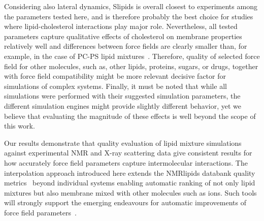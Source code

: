 \documentclass[journal=jctcce]{achemso}
\begin{document}
Considering also lateral dynamics, Slipids is overall closest to experiments among the parameters tested here, and is therefore probably the best choice for studies where lipid-cholesterol interactions play major role. 
Nevertheless, all tested parameters capture qualitative effects of cholesterol on membrane properties relatively well and differences between force fields are clearly smaller than, for example, in the case of PC-PS lipid mixtures~\cite{antila2022emerging}. Therefore, quality of selected force field for other molecules, such as,
other lipids, proteins, sugars, or drugs, 
together with force field compatibility might be more relevant decisive factor for simulations of complex systems. Finally, it must be noted that while all simulations were performed with their suggested simulation parameters, the different simulation engines might provide slightly different behavior, yet we believe that evaluating the magnitude of these effects is well beyond the scope of this work.

Our results demonstrate that quality evaluation of lipid mixture simulations against experimental NMR and X-ray scattering data give consistent results for how accurately force field parameters capture intermolecular interactions. The interpolation approach introduced here extends the NMRlipids databank quality metrics~\cite{NMRlipidsDatabank} beyond individual systems enabling automatic ranking of not only lipid mixtures but also membrane mixed with other molecules such as ions. Such tools will strongly support the emerging endeavours for automatic improvements of force field parameters~\cite{antila2022emerging}.
\end{document}
